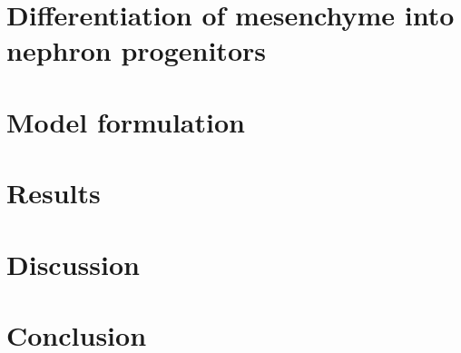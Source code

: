 \documentclass[pdftex,10pt,a4paper,twocolumn]{article}
\begin{document}
\section{Differentiation of mesenchyme into nephron progenitors}

\section{Model formulation}

\section{Results}

\section{Discussion}

\section{Conclusion}


\end{document}
